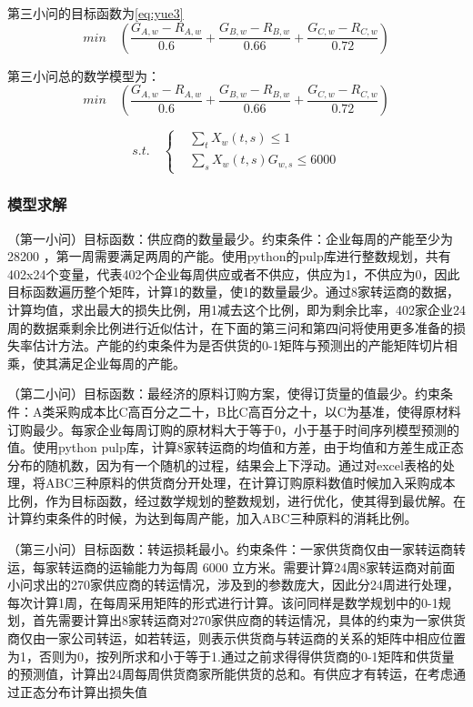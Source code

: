 \documentclass[withoutpreface,bwprint]{cumcmthesis} %
\begin{document}
第三小问的目标函数为\cref{eq:yue3}
\begin{equation}
min \quad (\frac{G_{A,w}-R_{A,w}}{0.6}+\frac{G_{B,w}-R_{B,w}}{0.66}+\frac{G_{C,w}-R_{C,w}}{0.72})
\label{eq:yue3}
\end{equation}

第三小问总的数学模型为：
\[
min \quad (\frac{G_{A,w}-R_{A,w}}{0.6}+\frac{G_{B,w}-R_{B,w}}{0.66}+\frac{G_{C,w}-R_{C,w}}{0.72})
\]

$$ s.t. \quad \left\{
\begin{aligned}
    & \sum\limits_t X_w(t,s)\le 1 \\
    & \sum\limits_s X_w(t,s)G_{w,s}\le 6000
\end{aligned}
\right.
$$
\subsubsection{模型求解}
（第一小问）目标函数：供应商的数量最少。约束条件：企业每周的产能至少为 28200 ，第一周需要满足两周的产能。使用python的pulp库进行整数规划，共有402x24个变量，代表402个企业每周供应或者不供应，供应为1，不供应为0，因此目标函数遍历整个矩阵，计算1的数量，使1的数量最少。通过8家转运商的数据，计算均值，求出最大的损失比例，用1减去这个比例，即为剩余比率，402家企业24周的数据乘剩余比例进行近似估计，在下面的第三问和第四问将使用更多准备的损失率估计方法。产能的约束条件为是否供货的0-1矩阵与预测出的产能矩阵切片相乘，使其满足企业每周的产能。

（第二小问）目标函数：最经济的原料订购方案，使得订货量的值最少。约束条件：A类采购成本比C高百分之二十，B比C高百分之十，以C为基准，使得原材料订购最少。每家企业每周订购的原材料大于等于0，小于基于时间序列模型预测的值。使用python pulp库，计算8家转运商的均值和方差，由于均值和方差生成正态分布的随机数，因为有一个随机的过程，结果会上下浮动。通过对excel表格的处理，将ABC三种原料的供货商分开处理，在计算订购原料数值时候加入采购成本比例，作为目标函数，经过数学规划的整数规划，进行优化，使其得到最优解。在计算约束条件的时候，为达到每周产能，加入ABC三种原料的消耗比例。

（第三小问）目标函数：转运损耗最小。约束条件：一家供货商仅由一家转运商转运，每家转运商的运输能力为每周 6000 立方米。需要计算24周8家转运商对前面小问求出的270家供应商的转运情况，涉及到的参数庞大，因此分24周进行处理，每次计算1周，在每周采用矩阵的形式进行计算。该问同样是数学规划中的0-1规划，首先需要计算出8家转运商对270家供应商的转运情况，具体的约束为一家供货商仅由一家公司转运，如若转运，则表示供货商与转运商的关系的矩阵中相应位置为1，否则为0，按列所求和小于等于1.通过之前求得得供货商的0-1矩阵和供货量的预测值，计算出24周每周供货商家所能供货的总和。有供应才有转运，在考虑通过正态分布计算出损失值
\end{document}
